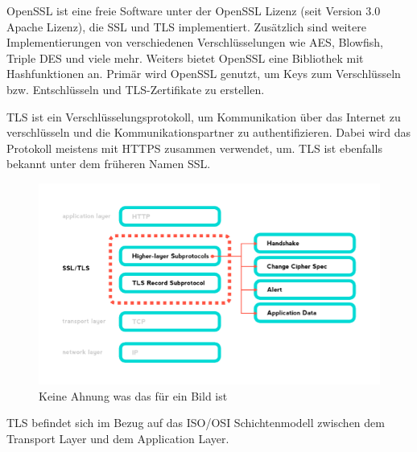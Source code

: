 

OpenSSL ist eine freie Software unter der OpenSSL Lizenz (seit Version 3.0 Apache Lizenz), die SSL und TLS implementiert. Zusätzlich sind weitere Implementierungen von verschiedenen Verschlüsselungen wie AES, Blowfish, Triple DES und viele mehr. Weiters bietet OpenSSL eine Bibliothek mit Hashfunktionen an. Primär wird OpenSSL genutzt, um Keys zum Verschlüsseln bzw. Entschlüsseln und TLS-Zertifikate zu erstellen. 



TLS ist ein Verschlüsselungsprotokoll, um Kommunikation über das Internet zu verschlüsseln und die Kommunikationspartner zu authentifizieren. Dabei wird das Protokoll meistens mit HTTPS zusammen verwendet, um. TLS ist ebenfalls bekannt unter dem früheren Namen SSL.  

\begin{figure}[H]
    \centering
    \includegraphics{media/OpenSSL/info.png}
    \caption{Keine Ahnung was das für ein Bild ist}
\end{figure}

TLS befindet sich im Bezug auf das ISO/OSI Schichtenmodell zwischen dem Transport Layer und dem Application Layer.


